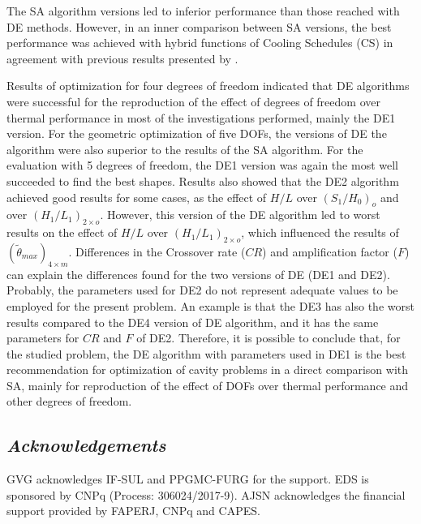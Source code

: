 \documentclass[12pt,fleqn]{article}
\begin{document}
The SA algorithm versions led to inferior performance than those reached with DE methods. However, in an inner comparison between SA versions, the best performance was achieved with hybrid functions of Cooling Schedules (CS) in agreement with previous results presented by \cite{Gonzales2015a,Gonzales2015b}.

Results of optimization for four degrees of freedom indicated that DE algorithms were successful for the reproduction of the effect of degrees of freedom over thermal performance in most of the investigations performed, mainly the DE1 version. For the geometric optimization of five DOFs, the versions of DE the algorithm  were also superior to the results of the SA algorithm. For the evaluation with 5 degrees of freedom, the DE1 version was again the most well succeeded to find the best shapes. Results also showed that the DE2 algorithm achieved good results for some cases, as the effect of $H/L$ over ${(S_{1}/H_{0})_{o}}$ and over ${(H_{1}/L_{1})_{2  \times o}}$. However, this version of the DE algorithm led to worst results on the effect of $H/L$ over ${(H_{1}/L_{1})_{2  \times o}}$, which influenced the results of $(\tilde{\theta}_{max})_{4\times m}$. Differences in the Crossover rate ($CR$) and amplification factor ($F$) can explain the differences found for the two versions of DE (DE1 and DE2). Probably, the parameters used for DE2 do not represent adequate values to be employed for the present problem. An example is that the DE3 has also the worst results compared to the DE4 version of DE algorithm, and it has the same parameters for $CR$ and $F$ of DE2. Therefore, it is possible to conclude that, for the studied problem, the DE algorithm with parameters used in DE1 is the best recommendation for optimization of cavity problems in a direct comparison with SA, mainly for reproduction of the effect of DOFs over thermal performance and other degrees of freedom.


\subsection*{\textit{Acknowledgements}}
GVG acknowledges IF-SUL and PPGMC-FURG for the support. EDS is sponsored by CNPq (Process: 306024/2017-9). AJSN acknowledges the financial support provided by FAPERJ, CNPq and CAPES.



\fontsize{11}{0}\selectfont







\end{document}
